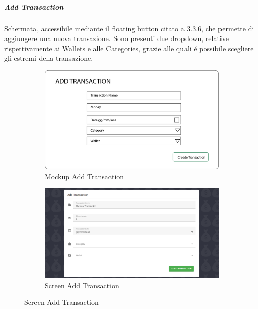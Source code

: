 \documentclass{report}
\begin{document}
\subparagraph{Add Transaction}
Schermata, accessibile mediante il floating button citato a 3.3.6, che permette di aggiungere una nuova transazione. Sono presenti due dropdown, relative rispettivamente ai Wallets e alle Categories, grazie alle quali é possibile scegliere gli estremi della transazione.
\begin{figure}[H]
    \begin{subfigure}
        \centering
        \includegraphics[scale=0.3]{images/mockups/Add Transaction.png}
        \caption{Mockup Add Transaction}
    \end{subfigure}
    \par\bigskip
    \begin{subfigure}
        \centering
        \includegraphics[scale=0.35]{images/screens/Add Transaction.png}
        \caption{Screen Add Transaction}
    \end{subfigure}
\end{figure}
\end{document}
